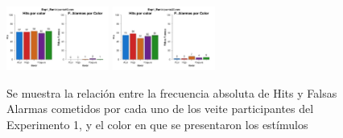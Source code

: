 \begin{figure}[th]
\includegraphics[width=0.30\textwidth]{Figures/Color_Exp1_P19} \includegraphics[width=0.30\textwidth]{Figures/Color_Exp1_P20} 
\caption[Hits y Falsas Alarmas obtenidos por Color; Experimento 1]{Se muestra la relación entre la frecuencia absoluta de Hits y Falsas Alarmas cometidos por cada uno de los veite participantes del Experimento 1, y el color en que se presentaron los estímulos}
\label{fig:Color_E1}
\end{figure}

